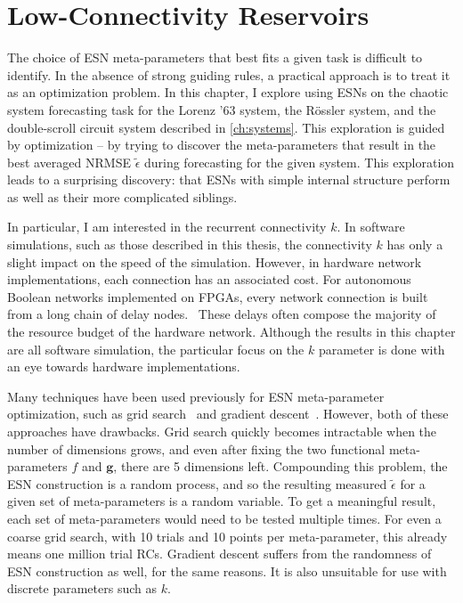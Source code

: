 \chapter{Low-Connectivity Reservoirs}\label{ch:low-connectivity}

The choice of ESN meta-parameters that best fits a given task is
difficult to identify. In the absence of strong guiding rules, a
practical approach is to treat it as an optimization problem. In this
chapter, I explore using ESNs on the chaotic system forecasting task
for the Lorenz '63 system, the R{\"{o}}ssler system, and the
double-scroll circuit system described in \cref{ch:systems}. This
exploration is guided by optimization -- by trying to discover the
meta-parameters that result in the best averaged NRMSE
$\tilde{\epsilon}$ during forecasting for the given system. This
exploration leads to a surprising discovery: that ESNs with
simple internal structure perform as well as their more complicated
siblings.

In particular, I am interested in the recurrent connectivity $k$. In
software simulations, such as those described in this thesis, the
connectivity $k$ has only a slight impact on the speed of the
simulation. However, in hardware network implementations, each
connection has an associated cost. For autonomous Boolean networks
implemented on FPGAs, every network connection is built from a long
chain of delay nodes.~\cite{canaday2018} These delays often compose the
majority of the resource budget of the hardware network. Although the
results in this chapter are all software simulation, the particular
focus on the $k$ parameter is done with an eye towards hardware
implementations.

Many techniques have been used previously for ESN meta-parameter
optimization, such as grid search~\cite{rodan2011} and gradient
descent~\cite{jaeger2007}. However, both of these approaches have
drawbacks. Grid search quickly becomes intractable when the number of
dimensions grows, and even after fixing the two functional
meta-parameters $f$ and $\bm{g}$, there are 5 dimensions
left. Compounding this problem, the ESN construction is a random
process, and so the resulting measured $\tilde{\epsilon}$ for a given
set of meta-parameters is a random variable. To get a meaningful
result, each set of meta-parameters would need to be tested multiple
times. For even a coarse grid search, with 10 trials and 10 points per
meta-parameter, this already means one million trial RCs. Gradient
descent suffers from the randomness of ESN construction as well, for
the same reasons. It is also unsuitable for use with discrete
parameters such as $k$.

